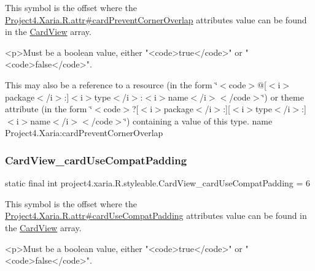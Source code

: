 This symbol is the offset where the \hyperlink{}{Project4.\+Xaria.\+R.\+attr\#card\+Prevent\+Corner\+Overlap} attribute\textquotesingle{}s value can be found in the \hyperlink{classproject4_1_1xaria_1_1R_1_1styleable_abef2e3d3e2b11dd786470094dbc57ea4}{Card\+View} array.

\begin{DoxyVerb}      <p>Must be a boolean value, either "<code>true</code>" or "<code>false</code>".
\end{DoxyVerb}
 

This may also be a reference to a resource (in the form \char`\"{}$<$code$>$@\mbox{[}$<$i$>$package$<$/i$>$\+:\mbox{]}$<$i$>$type$<$/i$>$\+:$<$i$>$name$<$/i$>$$<$/code$>$\char`\"{}) or theme attribute (in the form \char`\"{}$<$code$>$?\mbox{[}$<$i$>$package$<$/i$>$\+:\mbox{]}\mbox{[}$<$i$>$type$<$/i$>$\+:\mbox{]}$<$i$>$name$<$/i$>$$<$/code$>$\char`\"{}) containing a value of this type.  name Project4.\+Xaria\+:card\+Prevent\+Corner\+Overlap \mbox{\label{classproject4_1_1xaria_1_1R_1_1styleable_a82b54eed1db5f90c00cd724eaee04e6e}} 
\subsubsection{\texorpdfstring{Card\+View\+\_\+card\+Use\+Compat\+Padding}{CardView\_cardUseCompatPadding}}
{\footnotesize\ttfamily static final int project4.\+xaria.\+R.\+styleable.\+Card\+View\+\_\+card\+Use\+Compat\+Padding = 6\hspace{0.3cm}{\ttfamily [static]}}

This symbol is the offset where the \hyperlink{}{Project4.\+Xaria.\+R.\+attr\#card\+Use\+Compat\+Padding} attribute\textquotesingle{}s value can be found in the \hyperlink{classproject4_1_1xaria_1_1R_1_1styleable_abef2e3d3e2b11dd786470094dbc57ea4}{Card\+View} array.

\begin{DoxyVerb}      <p>Must be a boolean value, either "<code>true</code>" or "<code>false</code>".
\end{DoxyVerb}
 

